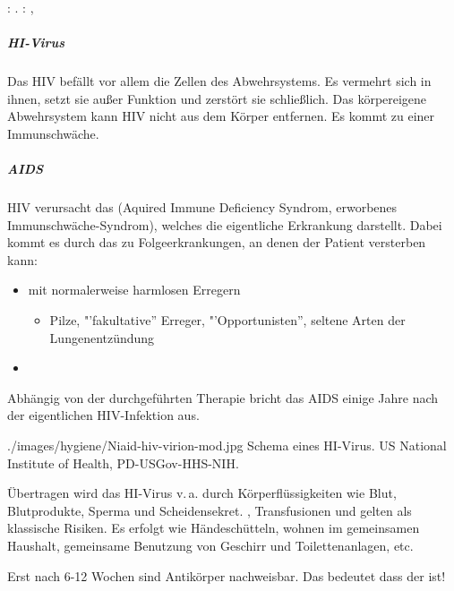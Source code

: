 : . 
: ,

{
\subparagraph{HI-Virus} Das HIV befällt vor allem die Zellen des
Abwehrsystems. Es vermehrt sich in ihnen, setzt sie außer Funktion und zerstört sie schließlich. Das körpereigene Abwehrsystem kann HIV nicht aus dem Körper
    entfernen.
Es kommt zu einer Immunschwäche.

\subparagraph{AIDS} HIV verursacht das  (Aquired Immune Deficiency
Syndrom, erworbenes Immunschwäche-Syndrom), welches die
eigentliche Erkrankung darstellt. Dabei kommt es durch das
 zu Folgeerkrankungen, an denen der Patient versterben kann:

\begin{itemize}
  \item {} mit normalerweise harmlosen
  Erregern
  \begin{itemize}
    \item Pilze, "'fakultative{\textquotedblright} Erreger,
    "'Opportunisten{\textquotedblright}, seltene Arten der
    Lungenentzündung
  \end{itemize}
  \item {}
\end{itemize}

Abhängig von der durchgeführten Therapie bricht das AIDS
einige Jahre nach der eigentlichen HIV-Infektion aus.
}{
}
{./images/hygiene/Niaid-hiv-virion-mod.jpg}
{Schema eines HI-Virus.}
{US National Institute of Health, PD-USGov-HHS-NIH.}









{%
Übertragen wird das HI-Virus v.\,a. durch Körperflüssigkeiten
wie Blut, Blutprodukte, Sperma und Scheidensekret.
, Transfusionen und
 gelten als klassische Risiken.
Es erfolgt  wie Händeschütteln, wohnen im
gemeinsamen Haushalt, gemeinsame Benutzung von Geschirr und
Toilettenanlagen, etc.
}{
}
{}
{}
{}

{Erst nach 6-12 Wochen sind Antikörper nachweisbar. Das bedeutet dass der
 ist!
}
{
}
{}
{}
{}


